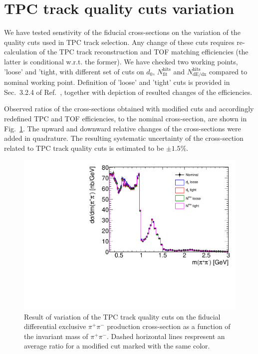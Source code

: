 \section{TPC track quality cuts variation}\label{sec:systTpcQuaCuts}

We have tested senstivity of the fiducial cross-sections on the variation of the quality cuts used in TPC track selection. Any change of these cuts requires re-calculation of the TPC track reconstruction and TOF matching efficiencies (the latter is conditional w.r.t. the former). We have checked two working points, 'loose' and 'tight, with different set of cuts on $d_{0}$, $N_{\text{fit}}^{\text{hits}}$ and $N^{\text{hits}}_{\text{dE/dx}}$ compared to nominal working point. Definition of 'loose' and 'tight' cuts is provided in Sec.~3.2.4 of Ref.~\cite{supplementaryNote}, together with depiction of resulted changes of the efficiencies.

Observed ratios of the cross-sections obtained with modified cuts and accordingly redefined TPC and TOF efficiencies, to the nominal cross-section, are shown in Fig.~\ref{fig:tpcQuaVariation}. The upward and downward relative changes of the cross-sections were added in quadrature. The resulting systematic uncertainty of the cross-section related to TPC track quality cuts is estimated to be $\pm1.5\%$.
 
\begin{figure}[h]
\centering
\includegraphics[width=.8\textwidth,page=2]{graphics/systematics/TrackQualityCutVariation_InvMass.pdf}
%
\caption[Result of variation of the TPC track quality cuts on $d\sigma/dm(\pi^{+}\pi^{-})$.]{Result of variation of the TPC track quality cuts on the fiducial differential exclusive $\pi^{+}\pi^{-}$ production cross-section as a function of the invariant mass of $\pi^{+}\pi^{-}$. Dashed horizontal lines respresent an average ratio for a modified cut marked with the same color.}
\label{fig:tpcQuaVariation}
\end{figure}


